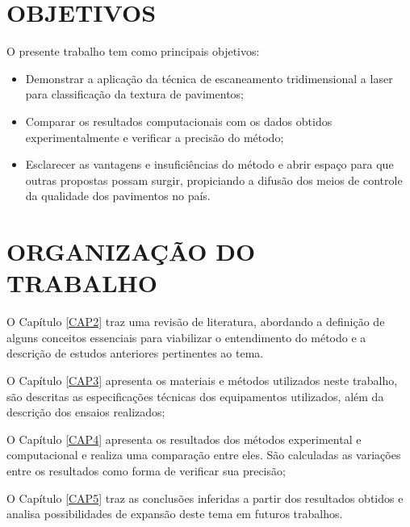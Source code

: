 \section{OBJETIVOS}
O presente trabalho tem como principais objetivos: 

\begin{itemize}

\item Demonstrar a aplicação da técnica de escaneamento tridimensional a laser para classificação da textura de pavimentos;

\item Comparar os resultados computacionais com os dados obtidos experimentalmente e verificar a precisão do método; 

\item Esclarecer as vantagens e insuficiências do método e abrir espaço para que outras propostas possam surgir, propiciando a difusão dos meios de controle da qualidade dos pavimentos no país. 
\end{itemize}

\section{ORGANIZAÇÃO DO TRABALHO}

O Capítulo \ref{CAP2} traz uma revisão de literatura, abordando a definição de alguns conceitos essenciais para viabilizar o entendimento do método e a descrição de estudos anteriores pertinentes ao tema.

O Capítulo  \ref{CAP3} apresenta os materiais e métodos utilizados neste trabalho, são descritas as especificações técnicas dos equipamentos utilizados, além da descrição dos ensaios realizados; 

O Capítulo  \ref{CAP4} apresenta os resultados dos métodos experimental e computacional e realiza uma comparação entre eles. São calculadas as variações entre os resultados como forma de verificar sua precisão; 

O Capítulo \ref{CAP5} traz as conclusões inferidas a partir dos resultados obtidos e analisa possibilidades de expansão deste tema em futuros trabalhos.


